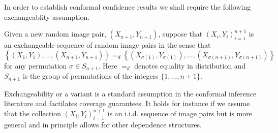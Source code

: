 In order to establish conformal confidence results we shall require the following exchangeablity assumption. 
\begin{assumption}\label{ass:ex}
		Given a new random image pair, $(X_{n+1},Y_{n+1})$, suppose that $(X_i, Y_i)_{i = 1}^{n+1}$ is an exchangeable sequence of random image pairs in the sense that 
	\begin{equation*}
		\left\lbrace (X_1,Y_1), \dots, (X_{n+1}, Y_{n+1}) \right\rbrace =_d \left\lbrace (X_{\sigma(1)}, Y_{\sigma(1)}), \dots, (X_{\sigma(n+1)}, Y_{\sigma(n+1)}) \right\rbrace
	\end{equation*}
	for any permutation $\sigma \in S_{n+1}$. Here $=_d$ denotes equality in distribution and $S_{n+1} $ is the group of permutations of the integers $\lbrace1, \dots, n+1\rbrace$.
\end{assumption}
Exchangeability or a variant is a standard assumption in the conformal inference literature \citep{Angelopoulos2021} and factilates coverage guarantees. It holds for instance if we assume that the collection $(X_i, Y_i)_{i = 1}^{n+1}$ is an i.i.d. sequence of image pairs but is more general and in principle allows for other dependence structures. 

